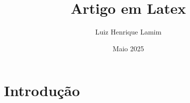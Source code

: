 \documentclass{article}
\title{Artigo em Latex}
\author{Luiz Henrique Lamim}
\date{Maio 2025}
\begin{document}
\maketitle

\section{Introdução}

\lipsum[1]

\lipsum[1]

\lipsum[1]

\lipsum[1]

\lipsum[1]

\lipsum[1]

\lipsum[1]

\lipsum[1]

\lipsum[1]

\lipsum[1]

\lipsum[1]

\lipsum[1]

\lipsum[1]

\lipsum[1]
\end{document}
